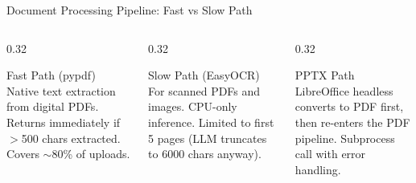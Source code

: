 \documentclass[aspectratio=169,10pt]{beamer}
\begin{document}
\begin{frame}{Document Processing Pipeline: Fast vs Slow Path}
\begin{center}
\end{center}

\vspace{4pt}
\begin{columns}[T]
\begin{column}{0.32\textwidth}
\begin{exampleblock}{\scriptsize Fast Path (pypdf)}
\scriptsize Native text extraction from digital PDFs. Returns immediately if $>$500 chars extracted. Covers $\sim$80\% of uploads.
\end{exampleblock}
\end{column}
\begin{column}{0.32\textwidth}
\begin{block}{\scriptsize Slow Path (EasyOCR)}
\scriptsize For scanned PDFs and images. CPU-only inference. Limited to first 5 pages (LLM truncates to 6000 chars anyway).
\end{block}
\end{column}
\begin{column}{0.32\textwidth}
\begin{block}{\scriptsize PPTX Path}
\scriptsize LibreOffice headless converts to PDF first, then re-enters the PDF pipeline. Subprocess call with error handling.
\end{block}
\end{column}
\end{columns}
\end{frame}
\end{document}

